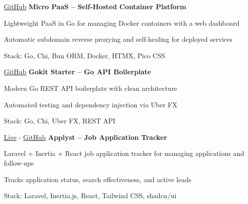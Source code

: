 \vspace{0.3 cm}


\begin{twocolentrylink}{
		\href{https://github.com/masmuss/micro-paas}{GitHub}
	}
	\textbf{Micro PaaS -- Self-Hosted Container Platform}
\end{twocolentrylink}
\begin{onecolentry}
	\begin{highlights}
		\item Lightweight PaaS in Go for managing Docker containers with a web dashboard
		\item Automatic subdomain reverse proxying and self-healing for deployed services
		\item Stack: Go, Chi, Bun ORM, Docker, HTMX, Pico CSS
	\end{highlights}
\end{onecolentry}

\vspace{0.3 cm}


\begin{twocolentrylink}{
		\href{https://github.com/masmuss/gokit-starter}{GitHub}
	}
	\textbf{Gokit Starter -- Go API Boilerplate}
\end{twocolentrylink}
\begin{onecolentry}
	\begin{highlights}
		\item Modern Go REST API boilerplate with clean architecture
		\item Automated testing and dependency injection via Uber FX
		\item Stack: Go, Chi, Uber FX, REST API
	\end{highlights}
\end{onecolentry}

\vspace{0.3 cm}


\begin{twocolentrylink}{
		\href{https://applyst.khoirul.me}{Live}
		-
		\href{https://github.com/masmuss/applyst}{GitHub}
	}
	\textbf{Applyst -- Job Application Tracker}
\end{twocolentrylink}
\begin{onecolentry}
	\begin{highlights}
		\item Laravel + Inertia + React job application tracker for managing applications and follow-ups
		\item Tracks application status, search effectiveness, and active leads
		\item Stack: Laravel, Inertia.js, React, Tailwind CSS, shadcn/ui
	\end{highlights}
\end{onecolentry}
